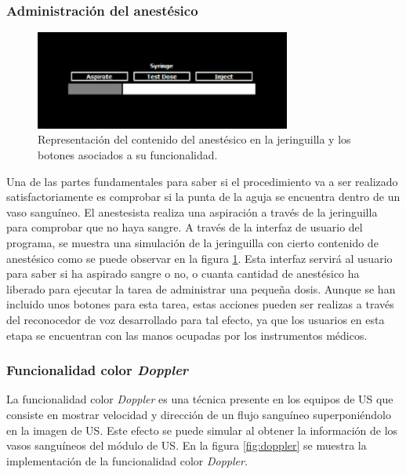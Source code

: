  
\subsubsection{Administración del anestésico}
 \begin{figure}[h]
    \centering
    \includegraphics[width=0.75\textwidth]{IMG/Syringe.PNG}
    \caption{ Representación del contenido del anestésico en la jeringuilla y los botones asociados a su funcionalidad.}
    \label{fig:anest}
\end{figure}

Una de las partes fundamentales para saber si el procedimiento va a ser realizado satisfactoriamente es comprobar si la punta de la aguja se encuentra dentro de un vaso sanguíneo. El anestesista realiza una aspiración a través de la jeringuilla para comprobar que no haya sangre. A través de la interfaz de usuario del programa, se muestra una simulación de la jeringuilla con cierto contenido de anestésico como se puede observar en la figura \ref{fig:anest}. Esta interfaz servirá al usuario para saber si ha aspirado sangre o no, o cuanta cantidad de anestésico ha liberado para ejecutar la tarea de administrar una pequeña dosis. Aunque se han incluido unos botones para esta tarea, estas acciones pueden ser realizas a través del reconocedor de voz desarrollado para tal efecto, ya que los usuarios en esta etapa se encuentran con las manos ocupadas por los instrumentos médicos.




\subsubsection{Funcionalidad color \emph{Doppler}}
\label{doppler}
La funcionalidad color \emph{Doppler} es una técnica presente en los equipos de \ac{US} que consiste en mostrar velocidad y dirección de un flujo sanguíneo superponiéndolo en la imagen de \ac{US}. Este efecto se puede simular al obtener la información de los vasos sanguíneos del módulo de \ac{US}.
En la figura \ref{fig:doppler} se muestra la implementación de la funcionalidad color \emph{Doppler}.

